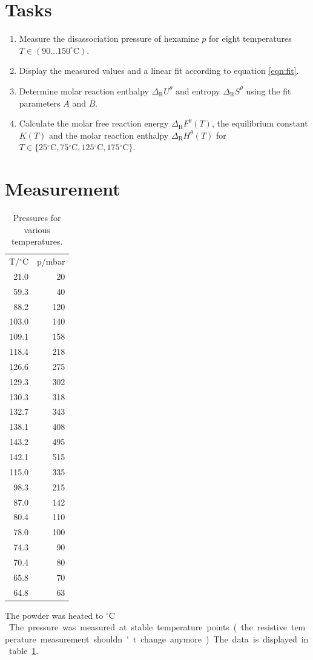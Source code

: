 \documentclass[english,twocolumn,DIV21,a4,10pt]{scrartcl}
\newcommand{\dr}{\Delta_\textrm{R}}
\newcommand{\dc}{{}^\circ\textrm{C}}
\begin{document}
\section{Tasks}
\begin{enumerate}
\item Measure the disassociation pressure of hexamine $p$ for eight
  temperatures $T\in (90\ldots150^\circ\textrm{C})$.
\item Display the measured values and a linear fit according to
  equation \eqref{eqn:fit}.
\item Determine molar reaction enthalpy $\dr U^\theta$ and entropy
  $\dr S^\theta$ using the fit parameters $A$ and $B$.
\item Calculate the molar free reaction energy $\dr F^\theta(T)$, the
  equilibrium constant $K(T)$ and the molar reaction enthalpy $\dr
  H^\theta(T)$ for $T\in\{25\dc,75\dc,125\dc,175\dc\}$.
\end{enumerate}

\section{Measurement}

  \begin{table}[htbp]
    \centering
    \begin{tabular}{rr}
 T/${}^\circ\textrm{C}$ & p/mbar\\
  21.0 &  20 \\
  59.3 &  40 \\
  88.2 & 120 \\
 103.0 & 140 \\
 109.1 & 158 \\
 118.4 & 218 \\
 126.6 & 275 \\
 129.3 & 302 \\
 130.3 & 318 \\
 132.7 & 343 \\
 138.1 & 408 \\
 143.2 & 495 \\
 142.1 & 515 \\
 115.0 & 335 \\
  98.3 & 215 \\
  87.0 & 142 \\
  80.4 & 110 \\
  78.0 & 100 \\
  74.3 &  90 \\
  70.4 &  80 \\
  65.8 &  70 \\
  64.8 &  63 \\
    \end{tabular}
    \caption{Pressures for various temperatures.}
    \label{tab:meas}
  \end{table}
  The powder was heated to \unit[140]{${}^\circ\textrm{C}$}.  The
  pressure was measured at stable temperature points (the resistive
  temperature measurement shouldn't change anymore). The data is
  displayed in table \ref{tab:meas}.
\end{document}

